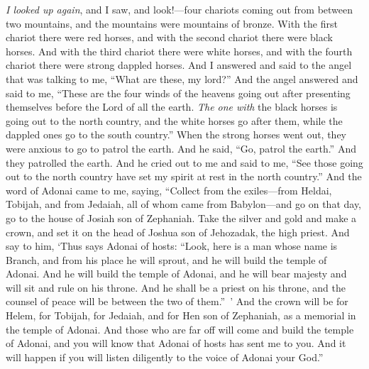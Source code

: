 \begin{biblechapter} %
 \textit{I looked up again}, and I saw, and look!—four chariots coming out from between two mountains, and the mountains were mountains of bronze.
\verse With the first chariot there were red horses, and with the second chariot there were black horses.
\verse And with the third chariot there were white horses, and with the fourth chariot there were strong dappled horses.
\verse And I answered and said to the angel that was talking to me, “What are these, my lord?”
\verse And the angel answered and said to me, “These are the four winds of the heavens going out after presenting themselves before the Lord of all the earth.
\verse \textit{The one with} the black horses is going out to the north country, and the white horses go after them, while the dappled ones go to the south country.”
\verse When the strong horses went out, they were anxious to go to patrol the earth. And he said, “Go, patrol the earth.” And they patrolled the earth.
\verse And he cried out to me and said to me, “See those going out to the north country have set my spirit at rest in the north country.”
 And the word of Adonai came to me, saying,
\verse “Collect from the exiles—from Heldai, Tobijah, and from Jedaiah, all of whom came from Babylon—and go on that day, go to the house of Josiah son of Zephaniah.
\verse Take the silver and gold and make a crown, and set it on the head of Joshua son of Jehozadak, the high priest.
\verse And say to him, ‘Thus says Adonai of hosts: “Look, here is a man whose name is Branch, and from his place he will sprout, and he will build the temple of Adonai.
\verse And he will build the temple of Adonai, and he will bear majesty and will sit and rule on his throne. And he shall be a priest on his throne, and the counsel of peace will be between the two of them.” ’
\verse And the crown will be for Helem, for Tobijah, for Jedaiah, and for Hen son of Zephaniah, as a memorial in the temple of Adonai.
\verse And those who are far off will come and build the temple of Adonai, and you will know that Adonai of hosts has sent me to you. And it will happen if you will listen diligently to the voice of Adonai your God.”
\end{biblechapter}

